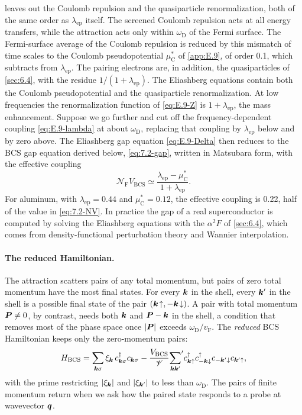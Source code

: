  leaves out the Coulomb repulsion and the quasiparticle renormalization, both of the same order as $\lambda_{\mathrm{ep}}$ itself. The screened Coulomb repulsion acts at all energy transfers, while the attraction acts only within $\omega_{\mathrm{D}}$ of the Fermi surface. The Fermi-surface average of the Coulomb repulsion is reduced by this mismatch of time scales to the Coulomb pseudopotential $\mu^*_{\mathrm{C}}$ of \cref{app:E.9}, of order 0.1, which subtracts from $\lambda_{\mathrm{ep}}$. The pairing electrons are, in addition, the quasiparticles of \cref{sec:6.4}, with the residue $1/(1 + \lambda_{\mathrm{ep}})$. The Eliashberg equations contain both the Coulomb pseudopotential and the quasiparticle renormalization. At low frequencies the renormalization function of \cref{eq:E.9-Z} is $1 + \lambda_{\mathrm{ep}}$, the mass enhancement. Suppose we go further and cut off the frequency-dependent coupling \cref{eq:E.9-lambda} at about $\omega_{\mathrm{D}}$, replacing that coupling by $\lambda_{\mathrm{ep}}$ below and by zero above. The Eliashberg gap equation \cref{eq:E.9-Delta} then reduces to the BCS gap equation derived below, \cref{eq:7.2-gap}, written in Matsubara form, with the effective coupling
\begin{equation}
  \mathcal{N}_{\mathrm{F}}V_{\mathrm{BCS}} \simeq \frac{\lambda_{\mathrm{ep}} - \mu^*_{\mathrm{C}}}{1 + \lambda_{\mathrm{ep}}} .
  \label{eq:7.2-NVren}
\end{equation}
For aluminum, with $\lambda_{\mathrm{ep}} = 0.44$ and $\mu^*_{\mathrm{C}} = 0.12$, the effective coupling is 0.22, half of the value in \cref{eq:7.2-NV}. In practice the gap of a real superconductor is computed by solving the Eliashberg equations with the $\alpha^2F$ of \cref{sec:6.4}, which comes from density-functional perturbation theory and Wannier interpolation.

\paragraph{The reduced Hamiltonian.} The attraction scatters pairs of any total momentum, but pairs of zero total momentum have the most final states. For every $\bm{k}$ in the shell, every $\bm{k}'$ in the shell is a possible final state of the pair $(\bm{k}\!\uparrow, -\bm{k}\!\downarrow)$. A pair with total momentum $\bm{P} \ne 0$, by contrast, needs both $\bm{k}$ and $\bm{P} - \bm{k}$ in the shell, a condition that removes most of the phase space once $|\bm{P}|$ exceeds $\omega_{\mathrm{D}}/v_{\mathrm{F}}$. The \emph{reduced} BCS Hamiltonian keeps only the zero-momentum pairs:
\begin{equation}
  H_{\mathrm{BCS}} = \sum_{\bm{k}\sigma}\xi_{\bm{k}}\,c^\dagger_{\bm{k}\sigma}c_{\bm{k}\sigma} - \frac{V_{\mathrm{BCS}}}{\mathscr{V}}{\sum_{\bm{k}\bm{k}'}}'c^\dagger_{\bm{k}\uparrow}c^\dagger_{-\bm{k}\downarrow}c_{-\bm{k}'\downarrow}c_{\bm{k}'\uparrow} ,
  \label{eq:7.2-HBCS}
\end{equation}
with the prime restricting $|\xi_{\bm{k}}|$ and $|\xi_{\bm{k}'}|$ to less than $\omega_{\mathrm{D}}$. The pairs of finite momentum return when we ask how the paired state responds to a probe at wavevector $\bm{q}$.

